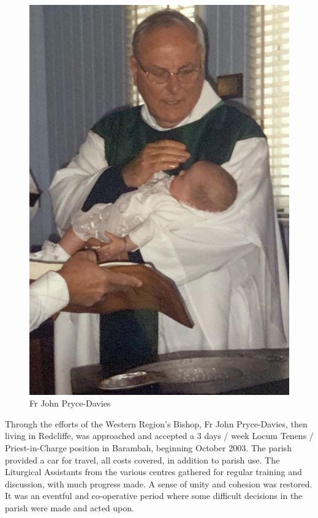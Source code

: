 \begin{figure}
\begin{center}
\includegraphics[width=.8\linewidth,center]{../images/JohnPryceDaviesWessling.jpg}
\caption{Fr John Pryce-Davies}
\end{center}
\end{figure}




Through the efforts of the Western Region's Bishop, Fr John Pryce-Davies, then living in Redcliffe, was approached and accepted a 3 days / week Locum Tenens / Priest-in-Charge position in Barambah, beginning October 2003. The parish provided a car for travel, all costs covered, in addition to parish use. The Liturgical Assistants from the various centres gathered for regular training and discussion, with much progress made. A sense of unity and cohesion was restored. It was an eventful and co-operative period where some difficult decisions in the parish were made and acted upon.









